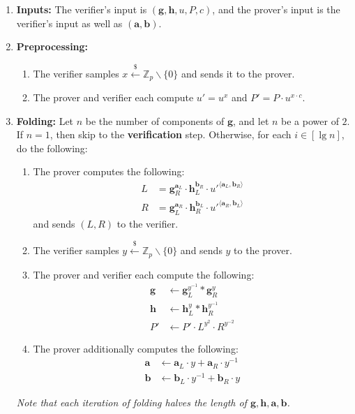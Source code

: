 \documentclass[11pt]{article}
\numberwithin{equation}{section}
\newcommand{\bfa}{\mathbf{a}}
\newcommand{\bfb}{\mathbf{b}}
\newcommand{\bfg}{\mathbf{g}}
\newcommand{\bfh}{\mathbf{h}}
\newcommand{\bbZ}{\mathbb{Z}}
\newcommand{\getsr}{\stackrel{\$}{\gets}}
\begin{document}
\begin{enumerate}
    \item \textbf{Inputs:} The verifier's input is $(\bfg, \bfh, u, P, c)$, and the prover's input is the verifier's input as well as $(\bfa, \bfb)$.
    \item \textbf{Preprocessing:}
    \begin{enumerate}
        \item The verifier samples $x \getsr \bbZ_p \backslash \{0\}$ and sends it to the prover.
        \item The prover and verifier each compute $u' = u^x$ and $P' = P \cdot u^{x \cdot c}$.        
    \end{enumerate}

    \item \textbf{Folding:} Let $n$ be the number of components of $\bfg$, and let $n$ be a power of $2$. If $n = 1$, then skip to the \textbf{verification} step. Otherwise, for each $i \in [\lg n]$, do the following:
\begin{enumerate}
    \item The prover computes the following:
    \begin{align*}
        L &= \bfg_R^{\bfa_L} \cdot \bfh_L^{\bfb_R} \cdot u'^{\langle \bfa_L, \bfb_R\rangle}\\
        R &= \bfg_L^{\bfa_R} \cdot \bfh_R^{\bfb_L} \cdot u'^{\langle \bfa_R, \bfb_L\rangle}
    \end{align*}
    and sends $(L, R)$ to the verifier.
    \item The verifier samples $y \getsr \bbZ_p \backslash \{0\}$ and sends $y$ to the prover.
    \item The prover and verifier each compute the following:
    \begin{align*}
        \bfg &\gets \bfg_L^{y^{-1}} * \bfg_R^{y}\\
        \bfh &\gets \bfh_L^{y} * \bfh_R^{y^{-1}}\\
        P' &\gets P' \cdot L^{y^2} \cdot R^{y^{-2}}
    \end{align*}
    \item The prover additionally computes the following:
    \begin{align*}
        \bfa &\gets \bfa_L \cdot y + \bfa_R \cdot y^{-1}\\
        \bfb &\gets \bfb_L \cdot y^{-1} + \bfb_R \cdot y
    \end{align*}
\end{enumerate}
\textit{Note that each iteration of folding halves the length of $\bfg, \bfh, \bfa, \bfb$.}


\end{enumerate}
\end{document}
